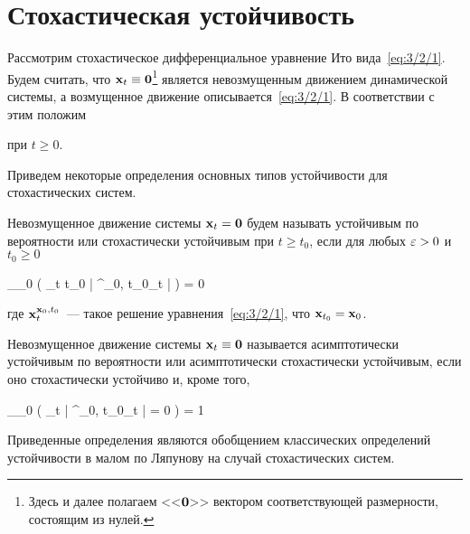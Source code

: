 \section{Стохастическая устойчивость}



Рассмотрим стохастическое дифференциальное уравнение Ито вида~\vref{eq:3/2/1}. Будем считать, что $\mathbf{x}_t \equiv \mathbf{0}$\footnote{ Здесь и далее полагаем <<$\mathbf{0}$>> вектором соответствующей размерности, состоящим из нулей. } является невозмущенным движением динамической системы, а возмущенное движение описывается~\ref{eq:3/2/1}. В соответствии с этим положим

\eeq

при $t \geqslant 0$.

\br

Приведем некоторые определения основных типов устойчивости для стохастических систем.

\begin{df}
	Невозмущенное движение системы $\mathbf{x}_t = \mathbf{0}$ будем называть устойчивым по вероятности или стохастически устойчивым при $t \geqslant t_0$, если для любых $\varepsilon > 0$ и $t_0 \geqslant 0$

	\beqn
		\lim\limits_{_0 \to {}} \prob \biggl( \sup\limits_{t \geqslant t_0} \bigl| \m{x}^{_0, t_0}_t \bigr| \geqslant \eps \biggr) = 0 \text{,}
	\eeqn

	где $\mathbf{x}^{\mathbf{x}_0, t_0}_t$~--- такое решение уравнения~\ref{eq:3/2/1}, что $\mathbf{x}_{t_0} = \mathbf{x}_0$.
\end{df}

\begin{df}
	Невозмущенное движение системы $\mathbf{x}_t \equiv \mathbf{0}$ называется асимптотически устойчивым по вероятности или асимптотически стохастически устойчивым, если оно стохастически устойчиво и, кроме того,
	
	\beqn
		\lim\limits_{_0 \to {}} \prob \biggl( \lim\limits_{t \to \infty} \bigl| \m{x}^{_0, t_0}_t \bigr| = 0 \biggr) = 1 
	\eeqn
\end{df}

Приведенные определения являются обобщением классических определений устойчивости в малом по Ляпунову на случай стохастических систем.

